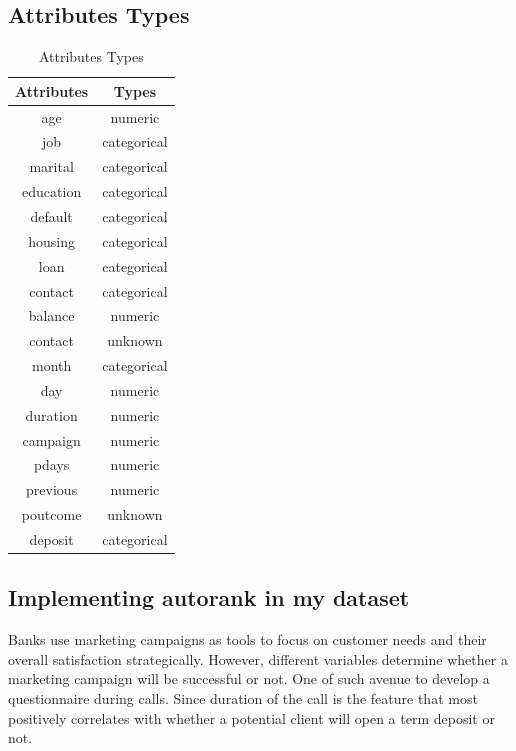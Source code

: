 \documentclass[12pt]{article}
\begin{document}
\newpage
\subsection{Attributes Types}

\begin{table}[h!]
	\centering
	\begin{tabular}{|c|c|}
			\hline
		\textbf{Attributes}& \textbf{Types}\\
		\hline
			\hline
	age	&numeric\\
		\hline
	job	&categorical\\
		\hline
	marital&	categorical\\
		\hline
	education&	categorical\\
		\hline
	default	&categorical\\
		\hline
	housing	&categorical\\
		\hline
	loan	&categorical\\
		\hline
	contact	&categorical\\
		\hline
	balance	&numeric\\
		\hline
	contact	&unknown\\
		\hline
	month&	categorical\\
		\hline
	day	&numeric\\
	    \hline
	duration&	numeric\\
		\hline
	campaign&	numeric\\
		\hline
	pdays	&numeric\\
		\hline
	previous&	numeric\\
		\hline
	poutcome	&unknown\\
		\hline
	deposit&	categorical\\
		\hline
	\end{tabular}

	\caption{Attributes Types}
\end{table}

\newpage
\subsection{Implementing autorank in my dataset}
Banks use marketing campaigns as tools to focus on customer needs and their overall satisfaction strategically. However, different variables determine whether a marketing campaign will be successful or not. One of such avenue to develop a questionnaire during calls. Since duration of the call is the feature that most positively correlates with whether a potential client will open a term deposit or not. 
\end{document}
